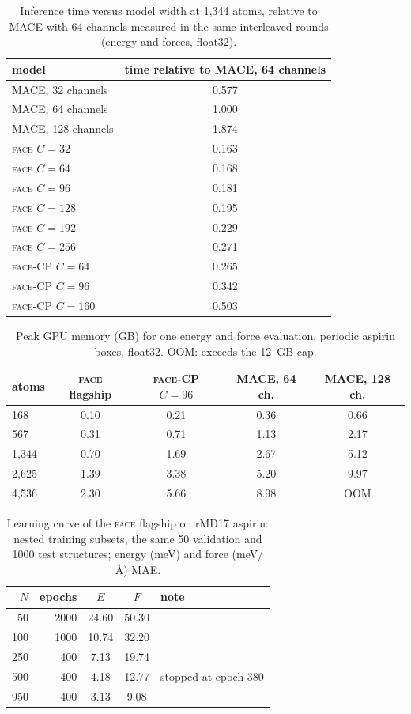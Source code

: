 \documentclass[journal=jctcce,manuscript=suppinfo,layout=traditional]{achemso}
\newcommand{\FACE}{\textsc{face}}
\begin{document}
\begin{table}[h]
\caption{Inference time versus model width at 1,344 atoms, relative to MACE with 64 channels measured in the same
interleaved rounds (energy and forces, float32).}
\label{tab:width}
\begin{tabular}{lc}
\toprule
model & time relative to MACE, 64 channels \\
\midrule
MACE, 32 channels & 0.577 \\
MACE, 64 channels & 1.000 \\
MACE, 128 channels & 1.874 \\
\FACE{} $C=32$ & 0.163 \\
\FACE{} $C=64$ & 0.168 \\
\FACE{} $C=96$ & 0.181 \\
\FACE{} $C=128$ & 0.195 \\
\FACE{} $C=192$ & 0.229 \\
\FACE{} $C=256$ & 0.271 \\
\FACE-CP $C=64$ & 0.265 \\
\FACE-CP $C=96$ & 0.342 \\
\FACE-CP $C=160$ & 0.503 \\
\bottomrule
\end{tabular}
\end{table}

\begin{table}[h]
\caption{Peak GPU memory (GB) for one energy and force evaluation, periodic aspirin boxes, float32. OOM: exceeds
the 12~GB cap.}
\label{tab:memory}
\begin{tabular}{lcccc}
\toprule
atoms & \FACE{} flagship & \FACE-CP $C=96$ & MACE, 64 ch. & MACE, 128 ch. \\
\midrule
168 & 0.10 & 0.21 & 0.36 & 0.66 \\
567 & 0.31 & 0.71 & 1.13 & 2.17 \\
1,344 & 0.70 & 1.69 & 2.67 & 5.12 \\
2,625 & 1.39 & 3.38 & 5.20 & 9.97 \\
4,536 & 2.30 & 5.66 & 8.98 & OOM \\
\bottomrule
\end{tabular}
\end{table}

\begin{table}[h]
\caption{Learning curve of the \FACE{} flagship on rMD17 aspirin: nested training subsets, the same 50 validation and
1000 test structures; energy (meV) and force (meV/\AA) MAE.}
\label{tab:learningcurve}
\begin{tabular}{rrccl}
\toprule
$N$ & epochs & $E$ & $F$ & note \\
\midrule
50 & 2000 & 24.60 & 50.30 &  \\
100 & 1000 & 10.74 & 32.20 &  \\
250 & 400 & 7.13 & 19.74 &  \\
500 & 400 & 4.18 & 12.77 & stopped at epoch 380 \\
950 & 400 & 3.13 & 9.08 &  \\
\bottomrule
\end{tabular}
\end{table}
\end{document}
